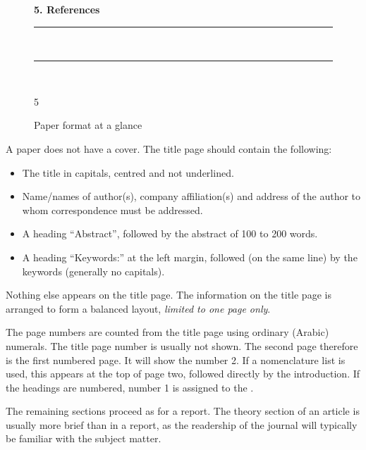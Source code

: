 \documentclass[a5paper, 10pt]{article}
\begin{document}
\begin{figure}[htbp]
{\begin{demopage}
      \textbf{5. References} \\
      \rule{0.9\textwidth}{2pt} \\
      \rule{0.9\textwidth}{2pt} \\
      \vfill
      \begin{centering}5 \\ \end{centering}
    \end{demopage}
  }

  \caption{Paper format at a glance}
  \label{fig:paperformatsummary}
\end{figure}

A paper does not have a cover.  The title page should contain the
following:
\begin{itemize}
\item The title in capitals, centred and not underlined.
\item Name/names of author(s), company affiliation(s) and address of
  the author to whom correspondence must be addressed.
\item A heading ``Abstract'', followed by the abstract of 100 to
  200 words.
\item A heading ``Keywords:'' at the left margin, followed (on the same
  line) by the keywords (generally no capitals).
\end{itemize}

Nothing else appears on the title page.  The information on the title
page is arranged to form a balanced layout, \emph{limited to one page only}.

The page numbers are counted from the title page using ordinary (Arabic) numerals.  
The title page number is usually not shown. 
The second page therefore is the first numbered page. 
It will show the number 2.  
If a nomenclature list is used, this appears at the top of page two, followed directly by the introduction.
If the headings are numbered, number 1 is assigned to the .  

The remaining sections proceed as for a report.  The theory section of
an article is usually more brief than in a report, as the readership
of the journal will typically be familiar with the subject matter.
\end{document}
